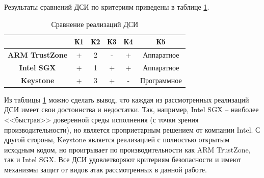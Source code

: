 Результаты сравнений ДСИ по критериям приведены в таблице \ref{table:comparsion}.

\begin{table}[!htb]
	\begin{center}
		\caption{Сравнение реализаций ДСИ}
		\label{table:comparsion}
		\begin{tabular}{|c|c|c|c|c|c|}
			\hline
			 & \bfseries К1 & \bfseries К2 & \bfseries К3 & \bfseries К4 & \bfseries К5 \\
			\hline
			\bfseries ARM TrustZone & + & 2 & - & + & Аппаратное \\ \hline
			\bfseries Intel SGX & + & 1 & + & + & Аппаратное\\ \hline
			\bfseries Keystone & + & 3 & + & - & Программное\\ \hline
		\end{tabular}
	\end{center}
\end{table}

Из таблицы \ref{table:comparsion} можно сделать вывод, что каждая из рассмотренных реализаций ДСИ имеет свои достоинства и недостатки. Так, например, Intel SGX -- наиболее <<быстрая>> доверенной среды исполнения (с точки зрения производительности), но является проприетарным решением от компании Intel. С другой стороны, Keystone является реализацией с полностью открытым исходным кодом, но проигрывает по производительности как ARM TrustZone, так и Intel SGX. Все ДСИ удовлетворяют критериям безопасности и имеют механизмы защит от видов атак рассмотренных в данной работе.

\pagebreak
